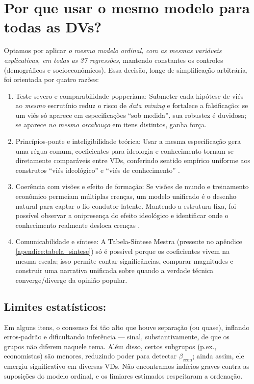 \section{Por que usar o mesmo modelo para todas as DVs?} 

Optamos por aplicar \emph{o mesmo modelo ordinal, com as mesmas variáveis explicativas, em todas as 37 regressões}, mantendo constantes os controles (demográficos e socioeconômicos). Essa decisão, longe de simplificação arbitrária, foi orientada por quatro razões:

\begin{enumerate}[label=\roman*)]
    \item Teste severo e comparabilidade popperiana: Submeter cada hipótese de viés ao \emph{mesmo} escrutínio reduz o risco de \emph{data mining} e fortalece a falsificação: se um viés só aparece em especificações “sob medida”, sua robustez é duvidosa; se aparece \emph{no mesmo arcabouço} em itens distintos, ganha força.
    \item Princípios-ponte e inteligibilidade teórica: Usar a mesma especificação gera uma régua comum, coeficientes para ideologia e conhecimento tornam-se diretamente comparáveis entre VDs, conferindo sentido empírico uniforme aos construtos “viés ideológico” e “viés de conhecimento” \cite{stigum2003}.
    \item Coerência com visões e efeito de formação: Se visões de mundo e treinamento econômico permeiam múltiplas crenças, um modelo unificado é o desenho natural para captar o fio condutor latente. Mantendo a estrutura fixa, foi possível observar a onipresença do efeito ideológico e identificar onde o conhecimento realmente desloca crenças \cite{sowell2007conflict,newman2020ideia}.
    \item Comunicabilidade e síntese: A Tabela-Síntese Mestra (presente no apêndice \ref{apendice:tabela_sintese}) só é possível porque os coeficientes vivem na mesma escala; isso permite contar significâncias, comparar magnitudes e construir uma narrativa unificada sobre quando a verdade técnica converge/diverge da opinião popular.
\end{enumerate}

\subsection{Limites estatísticos:} Em alguns itens, o consenso foi tão alto que houve separação (ou quase), inflando erros-padrão e dificultando inferência — sinal, substantivamente, de que os grupos não diferem naquele tema. Além disso, certos subgrupos (p.ex., economistas) são menores, reduzindo poder para detectar $\beta_{\text{econ}}$; ainda assim, ele emergiu significativo em diversas VDs. Não encontramos indícios graves contra as suposições do modelo ordinal, e os limiares estimados respeitaram a ordenação.

